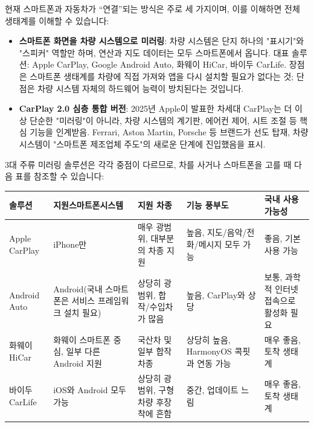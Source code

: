 


현재 스마트폰과 자동차가 “연결”되는 방식은 주로 세 가지이며, 이를 이해하면 전체 생태계를 이해할 수 있습니다:

\begin{itemize}
  \item \textbf{스마트폰 화면을 차량 시스템으로 미러링}: 차량 시스템은 단지 하나의 "표시기"와 "스피커" 역할만 하며, 연산과 지도 데이터는 모두 스마트폰에서 옵니다. 대표 솔루션: Apple CarPlay, Google Android Auto, 화웨이 HiCar, 바이두 CarLife. 장점은 스마트폰 생태계를 차량에 직접 가져와 앱을 다시 설치할 필요가 없다는 것; 단점은 차량 시스템 자체의 하드웨어 능력이 방치된다는 것입니다.
  \item \textbf{CarPlay 2.0 심층 통합 버전}: 2025년 Apple이 발표한 차세대 CarPlay는 더 이상 단순한 "미러링"이 아니라, 차량 시스템의 계기판, 에어컨 제어, 시트 조절 등 핵심 기능을 인계받음. Ferrari, Aston Martin, Porsche 등 브랜드가 선도 탑재, 차량 시스템이 "스마트폰 제조업체 주도"의 새로운 단계에 진입했음을 표시.
\end{itemize}


3대 주류 미러링 솔루션은 각각 중점이 다르므로, 차를 사거나 스마트폰을 고를 때 다음 표를 참조할 수 있습니다:

\begin{center}
\begin{tabularx}{\linewidth}{|X|X|X|X|X|}
\hline
\textbf{솔루션} & \textbf{지원스마트폰시스템} & \textbf{지원 차종} & \textbf{기능 풍부도} & \textbf{국내 사용 가능성} \tabularnewline
\hline
Apple CarPlay & iPhone만 & 매우 광범위, 대부분의 차종 지원 & 높음, 지도/음악/전화/메시지 모두 가능 & 좋음, 기본 사용 가능 \tabularnewline
Android Auto & Android(국내 스마트폰은 서비스 프레임워크 설치 필요) & 상당히 광범위, 합작/수입차가 많음 & 높음, CarPlay와 상당 & 보통, 과학적 인터넷 접속으로 활성화 필요 \tabularnewline
화웨이 HiCar & 화웨이 스마트폰 중심, 일부 다른 Android 지원 & 국산차 및 일부 합작 차종 & 상당히 높음, HarmonyOS 콕핏과 연동 가능 & 매우 좋음, 토착 생태계 \tabularnewline
바이두 CarLife & iOS와 Android 모두 가능 & 상당히 광범위, 구형 차량 후장착에 흔함 & 중간, 업데이트 느림 & 매우 좋음, 토착 생태계 \tabularnewline
\hline
\end{tabularx}
\end{center}


